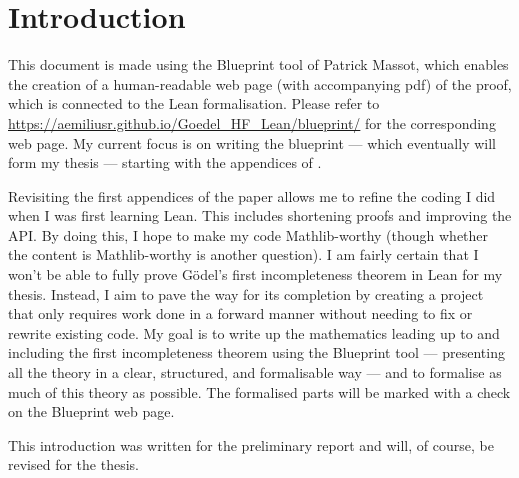 \chapter*{Introduction}
This document is made using the Blueprint tool of Patrick Massot, which enables the creation of a 
human-readable web page (with accompanying pdf) of the proof, which is connected to the Lean formalisation.
Please refer to \url{https://aemiliusr.github.io/Goedel_HF_Lean/blueprint/} for the corresponding web page.
My current focus is on writing the blueprint — which eventually will form my thesis — starting with
the appendices of \cite{swierczkowski2003finite}.

Revisiting the first appendices of the paper allows me to refine the coding I did when I was first learning Lean. 
This includes shortening proofs and improving the API. 
By doing this, I hope to make my code Mathlib-worthy (though whether the content is Mathlib-worthy is another question). 
I am fairly certain that I won't be able to fully prove Gödel's first incompleteness theorem in Lean for my thesis. 
Instead, I aim to pave the way for its completion by creating a project that only requires
work done in a forward manner without needing to fix or rewrite existing code.
My goal is to write up the mathematics leading up to and including the first incompleteness theorem using the Blueprint tool — 
presenting all the theory in a clear, structured, and formalisable way — and to formalise as much of this theory as possible. 
The formalised parts will be marked with a check on the Blueprint web page.

This introduction was written for the preliminary report and will, of course, be revised for the thesis.

